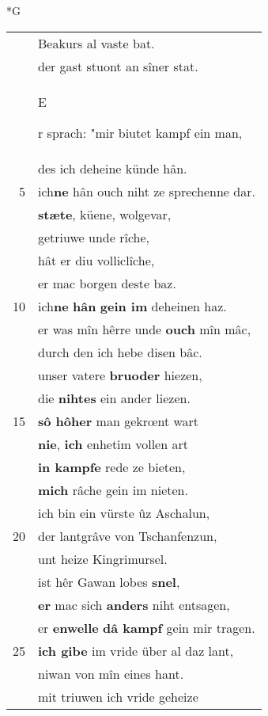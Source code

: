 \documentclass[8pt,a4paper,notitlepage]{article}
\begin{document}
\newpage
\begin{table}[ht]
\begin{minipage}[t]{0.5\linewidth}
\small
\begin{center}*G
\end{center}
\begin{tabular}{rl}
 & Beakurs al vaste bat.\\ 
 & der gast stuont an sîner stat.\\ 
 & \begin{large}E\end{large}r sprach: "mir biutet kampf ein man,\\ 
 & des ich deheine künde hân.\\ 
5 & ich\textbf{ne} hân ouch niht ze sprechenne dar.\\ 
 & \textbf{stæte}, küene, wolgevar,\\ 
 & getriuwe unde rîche,\\ 
 & hât er diu volliclîche,\\ 
 & er mac borgen deste baz.\\ 
10 & ich\textbf{ne} \textbf{hân} \textbf{gein im} deheinen haz.\\ 
 & er was mîn hêrre unde \textbf{ouch} mîn mâc,\\ 
 & durch den ich hebe disen bâc.\\ 
 & unser vatere \textbf{bruoder} hiezen,\\ 
 & die \textbf{nihtes} ein ander liezen.\\ 
15 & \textbf{sô hôher} man gekrœnt wart\\ 
 & \textbf{nie}, \textbf{ich} enhetim vollen art\\ 
 & \textbf{in kampfe} rede ze bieten,\\ 
 & \textbf{mich} râche gein im nieten.\\ 
 & ich bin ein vürste ûz Aschalun,\\ 
20 & der lantgrâve von Tschanfenzun,\\ 
 & unt heize Kingrimursel.\\ 
 & ist hêr Gawan lobes \textbf{snel},\\ 
 & \textbf{er} mac sich \textbf{anders} niht entsagen,\\ 
 & er \textbf{en}\textbf{welle} \textbf{dâ kampf} gein mir tragen.\\ 
25 & \textbf{ich gibe} im vride über al daz lant,\\ 
 & niwan von mîn eines hant.\\ 
 & mit triuwen ich vride geheize\\ 

\end{tabular}
\end{minipage}
\end{table}
\end{document}
